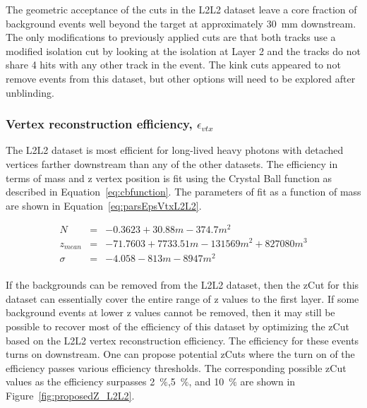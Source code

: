 The geometric acceptance of the cuts in the L2L2 dataset leave a core fraction of background events well beyond the target at approximately 30~mm downstream. The only modifications to previously applied cuts are that both tracks use a modified isolation cut by looking at the isolation at Layer 2 and the tracks do not share 4 hits with any other track in the event.  The kink cuts appeared to not remove events from this dataset, but other options will need to be explored after unblinding. 

\subsubsection{Vertex reconstruction efficiency, $\epsilon_{vtx}$}

The L2L2 dataset is most efficient for long-lived heavy photons with detached vertices farther downstream than any of the other datasets. The efficiency in terms of mass and z vertex position is fit using the Crystal Ball function as described in Equation~\eqref{eq:cbfunction}. The parameters of fit as a function of mass are shown in Equation~\eqref{eq:parsEpsVtxL2L2}.

\begin{eqnarray*}
\label{eq:parsEpsVtxL2L2}
N & = & -0.3623+30.88m-374.7m^2\\
z_{mean} & = & -71.7603+7733.51m-131569m^2+827080m^3\\
\sigma & = & -4.058-813m-8947m^2\\
\end{eqnarray*}

If the backgrounds can be removed from the L2L2 dataset, then the zCut for this dataset can essentially cover the entire range of z values to the first layer. If some background events at lower z values cannot be removed, then it may still be possible to recover most of the efficiency of this dataset by optimizing the zCut based on the L2L2 vertex reconstruction efficiency. The efficiency for these events turns on downstream. One can propose potential zCuts where the turn on of the efficiency passes various efficiency thresholds. The corresponding possible zCut values as the efficiency surpasses 2~$\%$,5~$\%$, and 10~$\%$ are shown in Figure~\ref{fig:proposedZ_L2L2}.

